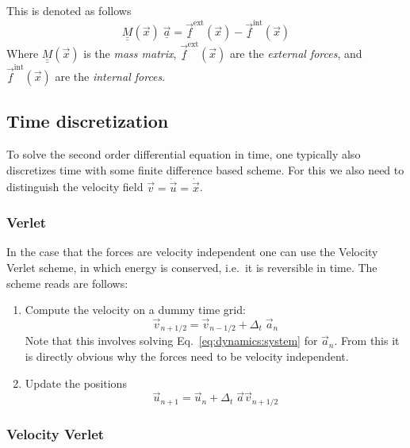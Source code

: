 \documentclass[times,namecite]{goose-article}
\begin{document}
This is denoted as follows
\begin{equation}
  \underline{\underline{M}}(\vec{x})\; \underline{\vec{a}}
  =
  \underline{\vec{f}}^\mathrm{ext}(\vec{x})
  -
  \underline{\vec{f}}^\mathrm{int}(\vec{x})
\end{equation}
Where $\underline{\underline{M}}(\vec{x})$ is the \emph{mass matrix}, $\underline{\vec{f}}^\mathrm{ext}(\vec{x})$ are the \emph{external forces}, and $\underline{\vec{f}}^\mathrm{int}(\vec{x})$ are the \emph{internal forces}.

\subsection{Time discretization}
\label{eq:dynamics:time}

To solve the second order differential equation in time, one typically also discretizes time with some finite difference based scheme. For this we also need to distinguish the velocity field $\vec{v} = \dot{\vec{u}} = \dot{\vec{x}}$.

\subsubsection{Verlet}

In the case that the forces are velocity independent one can use the Velocity Verlet scheme, in which energy is conserved, i.e.\ it is reversible in time. The scheme reads are follows:

\begin{enumerate}
  \item Compute the velocity on a dummy time grid:
  \begin{equation}
    \vec{v}_{n+1/2} = \vec{v}_{n-1/2} + \Delta_t \; \vec{a}_n
  \end{equation}
  Note that this involves solving Eq.~\eqref{eq:dynamics:system} for $\vec{a}_n$. From this it is directly obvious why the forces need to be velocity independent.
  \item Update the positions
  \begin{equation}
    \vec{u}_{n+1} = \vec{u}_n + \Delta_t \;\vec{a} \vec{v}_{n + 1/2}
  \end{equation}
\end{enumerate}

\subsubsection{Velocity Verlet}
\end{document}
